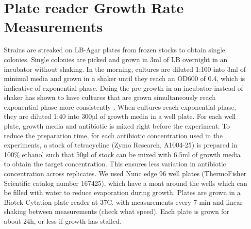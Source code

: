 \section{Plate reader Growth Rate Measurements}
Strains are streaked on LB-Agar plates from frozen stocks to obtain single colonies. Single colonies are picked and grown in 3ml of LB  overnight in an incubator without shaking. In the morning, cultures are diluted 1:100 into 3ml of minimal media and grown in a shaker until they reach an OD600 of 0.4, which is indicative of exponential phase. Doing the pre-growth in an incubator instead of shaker has shown to have cultures that are grown simultaneously reach exponential phase more consistently . When cultures reach exponential phase, they are diluted 1:40 into 300µl of growth media in a well plate. For each well plate, growth media and antibiotic is mixed right before the experiment. To reduce the preparation time, for each antibiotic concentration used in the experiments, a stock of tetracycline (Zymo Research, A1004-25) is prepared in 100\% ethanol such that 50µl of stock can be mixed with 6.5ml of growth media to obtain the target concentration. This ensures less variation in antibiotic concentration across replicates. We used Nunc edge 96 well plates (ThermoFisher Scientific catalog number 167425), which have a moat around the wells which can be filled with water to reduce evaporation during growth. Plates are grown in a Biotek Cytation  plate reader at 37C, with measurements every 7 min and linear shaking between measurements (check what speed). Each plate is grown for about 24h, or less if growth has stalled.